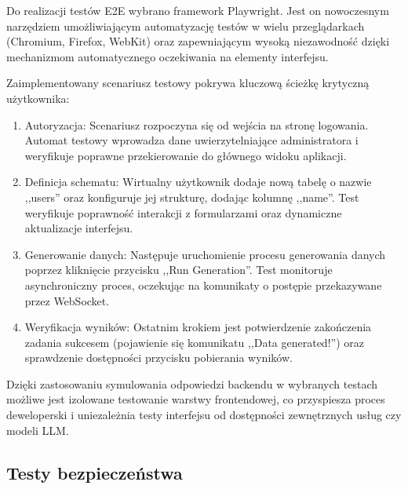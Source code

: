 Do realizacji testów \gls{E2E} wybrano framework Playwright. Jest on nowoczesnym narzędziem umożliwiającym automatyzację testów w wielu przeglądarkach (Chromium, Firefox, WebKit) oraz zapewniającym wysoką niezawodność dzięki mechanizmom automatycznego oczekiwania na elementy interfejsu.

Zaimplementowany scenariusz testowy pokrywa kluczową ścieżkę krytyczną \cite{happy_path} użytkownika:
\begin{enumerate}
    \item Autoryzacja: Scenariusz rozpoczyna się od wejścia na stronę logowania. Automat testowy wprowadza dane uwierzytelniające administratora i weryfikuje poprawne przekierowanie do głównego widoku aplikacji.
    \item Definicja schematu: Wirtualny użytkownik dodaje nową tabelę o nazwie ,,users'' oraz konfiguruje jej strukturę, dodając kolumnę ,,name''. Test weryfikuje poprawność interakcji z formularzami oraz dynamiczne aktualizacje interfejsu.
    \item Generowanie danych: Następuje uruchomienie procesu generowania danych poprzez kliknięcie przycisku ,,Run Generation''. Test monitoruje asynchroniczny proces, oczekując na komunikaty o postępie przekazywane przez WebSocket.
    \item Weryfikacja wyników: Ostatnim krokiem jest potwierdzenie zakończenia zadania sukcesem (pojawienie się komunikatu ,,Data generated!'') oraz sprawdzenie dostępności przycisku pobierania wyników.
\end{enumerate}

Dzięki zastosowaniu symulowania odpowiedzi backendu w wybranych testach możliwe jest izolowane testowanie warstwy frontendowej, co przyspiesza proces deweloperski i uniezależnia testy interfejsu od dostępności zewnętrznych usług czy modeli \gls{LLM}.

\subsection*{Testy bezpieczeństwa}

